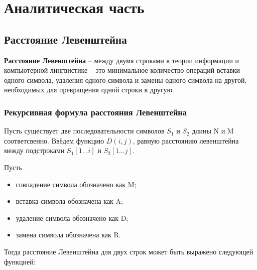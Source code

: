 \chapter{Аналитическая часть}

\section{Расстояние Левенштейна}

\textbf{Расстояние Левенштейна} -- между двумя строками в теории информации и компьютерной лингвистике -- это минимальное количество операций вставки одного символа, удаления одного символа и замены одного символа на другой, необходимых для превращения одной строки в другую.~\cite{itmo-levenstein}

\subsection{Рекурсивная формула расстояния Левенштейна}

Пусть существует две последовательности символов $S_1$ и $S_2$ длины N и M соответсвенно. Ввёдем функцию $D(i, j)$, равную расстоянию левенштейна между подстроками $S_1[1...i]$ и $S_2[1...j]$.

Пусть
\begin{itemize}
    \item совпадение символа обозначено как M;
    \item вставка символа обозначена как A;
    \item удаление символа обозначено как D;
    \item замена символа обозначена как R.
\end{itemize}

Тогда расстояние Левенштейна для двух строк может быть выражено следующей функцией:


